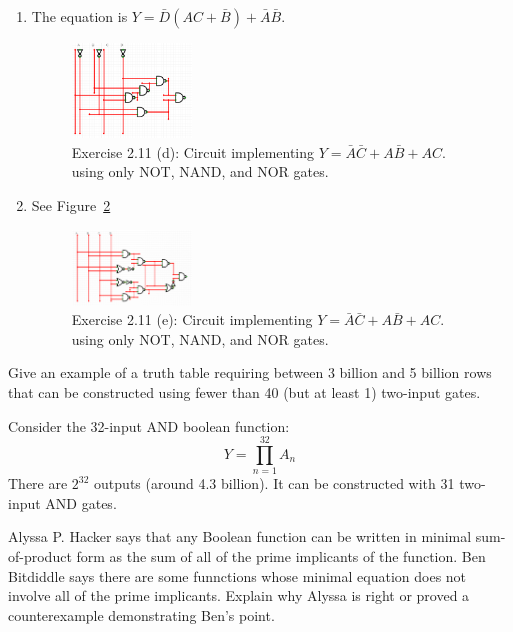 \documentclass[12pt]{article}
\newenvironment{ex}[2][Exercise]{\begin{trivlist}
		\item[\hskip \labelsep {\bfseries #1}\hskip \labelsep {\bfseries #2.}]}{\end{trivlist}}
\newenvironment{sol}[1][Solution]{\begin{trivlist}
		\item[\hskip \labelsep {\bfseries #1:}]}{\end{trivlist}}
\begin{document}
\begin{sol}
\begin{enumerate}[label=(\alph*)]
		\item The equation is 	$Y=\bar{D}(AC+\bar{B})+\bar{A}\bar{B}$.
		\begin{figure}
			\centering
			\includegraphics[width=0.3\textwidth]{02-11d-circuit}
			\caption{Exercise 2.11 (d): Circuit implementing $Y=\bar{A}\bar{C}+A\bar{B}+AC$. using only NOT, NAND, and NOR gates.}
			\label{02-11d}
		\end{figure}
		\item See Figure~\ref{02-11e}
		\begin{figure}
			\centering
			\includegraphics[width=0.3\textwidth]{02-11e-circuit}
			\caption{Exercise 2.11 (e): Circuit implementing $Y=\bar{A}\bar{C}+A\bar{B}+AC$. using only NOT, NAND, and NOR gates.}
			\label{02-11e}
		\end{figure}
	\end{enumerate}
\end{sol}

\begin{ex}{2.19}
	Give an example of a truth table requiring between 3 billion and 5 billion rows that can be constructed using fewer than 40 (but at least 1) two-input gates.
\end{ex}

\begin{sol}
	Consider the 32-input AND boolean function:
	\[
	Y=\prod_{n=1}^{32}A_n
	\]
	There are $2^{32}$ outputs (around 4.3 billion).
	It can be constructed with 31 two-input AND gates.
\end{sol}

\begin{ex}{2.21}
	Alyssa P. Hacker says that any Boolean function can be written in minimal sum-of-product form as the sum of all of the prime implicants of the function.
	Ben Bitdiddle says there are some funnctions whose minimal equation
	does not involve all of the prime implicants. Explain why Alyssa is right or
	proved a counterexample demonstrating Ben's point.
\end{ex}
\end{document}
